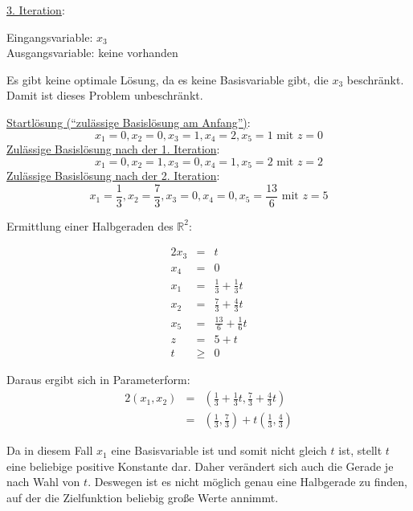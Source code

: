 \documentclass[10pt,a4paper,oneside,ngerman,numbers=noenddot]{scrartcl}
\begin{document}
		\underline{3. Iteration}:
		
		Eingangsvariable: $x_{3}$ \\
		Ausgangsvariable: keine vorhanden
		
		Es gibt keine optimale Lösung, da es keine Basisvariable gibt, die $x_{3}$ beschränkt. Damit ist dieses Problem unbeschränkt.
		
		\underline{Startlösung ("`zulässige Basislösung am Anfang"')}:
		\[
			x_{1} = 0, x_{2} = 0, x_{3} = 1, x_{4} = 2, x_{5} = 1 \text{ mit } z = 0
		\]
		\underline{Zulässige Basislösung nach der 1. Iteration}:
		\[
			x_{1} = 0, x_{2} = 1, x_{3} = 0, x_{4} = 1, x_{5} = 2 \text{ mit } z = 2
		\]
		\underline{Zulässige Basislösung nach der 2. Iteration}:
		\[
			x_{1} = \frac{1}{3}, x_{2} = \frac{7}{3}, x_{3} = 0, x_{4} = 0, x_{5} = \frac{13}{6} \text{ mit } z = 5
		\]
		
		Ermittlung einer Halbgeraden des $\mathbb{R}^{2}$:
		
		\begin{alignat*}{2}
			x_{3} &=& t \\
			x_{4} &=& 0 \\
			x_{1} &=& \frac{1}{3} + \frac{1}{3}t \\
			x_{2} &=& \frac{7}{3} + \frac{4}{3}t \\
			x_{5} &=& \frac{13}{6} + \frac{1}{6}t \\
			z &=& 5 + t \\
			t &\geq & 0
		\end{alignat*}
		
		Daraus ergibt sich in Parameterform: 
		\begin{alignat*}{2}
			(x_{1}, x_{2}) &=& \left(\frac{1}{3} + \frac{1}{3}t, \frac{7}{3} + \frac{4}{3}t\right) \\
			&=& \left(\frac{1}{3}, \frac{7}{3}\right) + t\left(\frac{1}{3}, \frac{4}{3}\right)
		\end{alignat*}
		
		Da in diesem Fall $x_{1}$ eine Basisvariable ist und somit nicht gleich $t$ ist, stellt $t$ eine beliebige positive Konstante dar. Daher verändert sich auch die Gerade je nach Wahl von $t$. Deswegen ist es nicht möglich genau eine Halbgerade zu finden, auf der die Zielfunktion beliebig große Werte annimmt.
\end{document}
